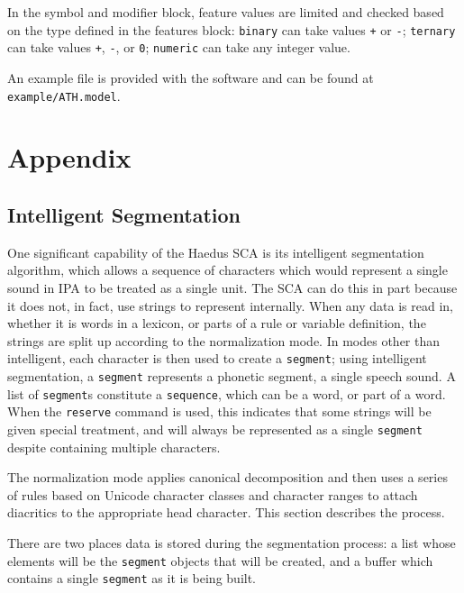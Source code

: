 \documentclass[10pt,letterpaper]{article}
\begin{document}
In the symbol and modifier block, feature values are limited and checked based on the type defined in the features block: \texttt{binary} can take values \texttt{+} or \texttt{-}; \texttt{ternary} can take values \texttt{+}, \texttt{-}, or \texttt{0}; \texttt{numeric} can take any integer value.

An example file is provided with the software and can be found at \texttt{example/ATH.model}.


\section{Appendix}
\label{sec:appendix}

\subsection{Intelligent Segmentation}
\label{sub:segmentation}
One significant capability of the Haedus SCA is its intelligent segmentation algorithm, which allows a sequence of characters which would represent a single sound in IPA to be treated as a single unit. The SCA can do this in part because it does not, in fact, use strings to represent internally. When any data is read in, whether it is words in a lexicon, or parts of a rule or variable definition, the strings are split up according to the normalization mode. In modes other than intelligent, each character is then used to create a \texttt{segment}; using intelligent segmentation, a \texttt{segment} represents a phonetic segment, a single speech sound. A list of \texttt{segment}s constitute a \texttt{sequence}, which can be a word, or part of a word. When the \texttt{reserve} command is used, this indicates that some strings will be given special treatment, and will always be represented as a single \texttt{segment} despite containing multiple characters.

The normalization mode applies canonical decomposition and then uses a series of rules based on Unicode character classes and character ranges to attach diacritics to the appropriate head character. This section describes the process.

There are two places data is stored during the segmentation process: a list whose elements will be the \texttt{segment} objects that will be created, and a buffer which contains a single \texttt{segment} as it is being built.
\end{document}
